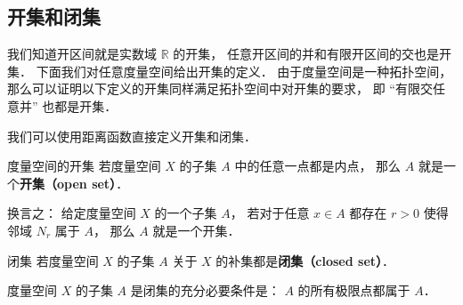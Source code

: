 
\subsection{开集和闭集}
我们知道开区间就是实数域 $\mathbb R$ 的开集， 任意开区间的并和有限开区间的交也是开集． 下面我们对任意度量空间给出开集的定义． 由于度量空间是一种拓扑空间， 那么可以证明以下定义的开集同样满足拓扑空间中对开集的要求， 即 “有限交任意并” 也都是开集．





我们可以使用距离函数直接定义开集和闭集．
\begin{definition}{度量空间的开集}
若度量空间 $X$ 的子集 $A$ 中的任意一点都是内点， 那么 $A$ 就是一个\textbf{开集（open set）}．

换言之： 给定度量空间 $X$ 的一个子集 $A$， 若对于任意 $x \in A$ 都存在 $r > 0$ 使得邻域 $N_r$ 属于 $A$， 那么 $A$ 就是一个开集．
\end{definition}

\begin{definition}{闭集}
若度量空间 $X$ 的子集 $A$ 关于 $X$ 的补集都是\textbf{闭集（closed set）}．
\end{definition}

\begin{theorem}{}
度量空间 $X$ 的子集 $A$ 是闭集的充分必要条件是： $A$ 的所有极限点都属于 $A$．
\end{theorem}
